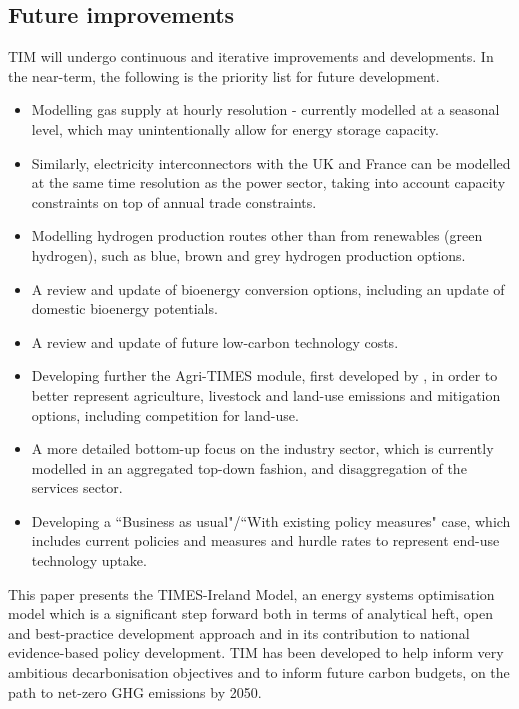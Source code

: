 \documentclass[gmd,manuscript]{copernicus}
\begin{document}
\subsection{Future improvements}
TIM will undergo continuous and iterative improvements and developments. In the near-term, the following is the priority list for future development.
\begin{itemize}
 \item Modelling gas supply at hourly resolution - currently modelled at a seasonal level, which may unintentionally allow for energy storage capacity.
 \item Similarly, electricity interconnectors with the UK and France can be modelled at the same time resolution as the power sector, taking into account capacity constraints on top of annual trade constraints.
 \item Modelling hydrogen production routes other than from renewables (green hydrogen), such as blue, brown and grey hydrogen production options. 
 \item A review and update of bioenergy conversion options, including an update of domestic bioenergy potentials. 
 \item A review and update of future low-carbon technology costs.
 \item Developing further the Agri-TIMES module, first developed by \citet{Chiodi2016}, in order to better represent agriculture, livestock and land-use emissions and mitigation options, including competition for land-use.
 \item A more detailed bottom-up focus on the industry sector, which is currently modelled in an aggregated top-down fashion, and disaggregation of the services sector.
 \item Developing a ``Business as usual"/``With existing policy measures" case, which includes current policies and measures and hurdle rates to represent end-use technology uptake.
\end{itemize}

\conclusions  %
\label{s:conclusion}
This paper presents the TIMES-Ireland Model, an energy systems optimisation model which is a significant step forward both in terms of analytical heft, open and best-practice development approach and in its contribution to national evidence-based policy development. TIM has been developed to help inform very ambitious decarbonisation objectives and to inform future carbon budgets, on the path to net-zero GHG emissions by 2050. 
\end{document}

